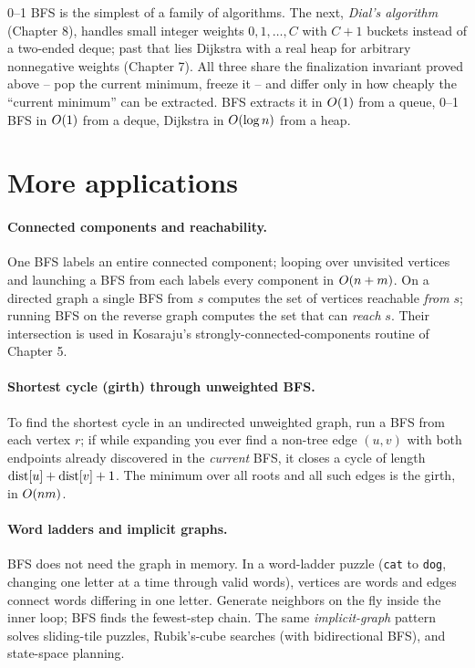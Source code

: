 \begin{connectionbox}
0--1 BFS is the simplest of a family of algorithms. The next, \emph{Dial's algorithm}
(Chapter 8), handles small integer weights $0,1,\dots,C$ with $C+1$ buckets
instead of a two-ended deque; past that lies Dijkstra with a real heap for
arbitrary nonnegative weights (Chapter 7). All three share the finalization
invariant proved above -- pop the current minimum, freeze it -- and differ only
in how cheaply the ``current minimum'' can be extracted. BFS extracts it in
$O(1)$ from a queue, 0--1 BFS in $O(1)$ from a deque, Dijkstra in
$O(\log n)$ from a heap.
\end{connectionbox}

\section{More applications}
\label{ch02:apps}

\paragraph{Connected components and reachability.}
One BFS labels an entire connected component; looping over unvisited vertices and
launching a BFS from each labels every component in $O(n+m)$. On a directed
graph a single BFS from $s$ computes the set of vertices reachable \emph{from}
$s$; running BFS on the reverse graph computes the set that can \emph{reach} $s$.
Their intersection is used in Kosaraju's strongly-connected-components routine of
Chapter 5.

\paragraph{Shortest cycle (girth) through unweighted BFS.}
To find the shortest cycle in an undirected unweighted graph, run a BFS from each
vertex $r$; if while expanding you ever find a non-tree edge $(u,v)$ with both
endpoints already discovered in the \emph{current} BFS, it closes a cycle of
length $\operatorname{dist}[u]+\operatorname{dist}[v]+1$. The minimum over all roots and all such edges is the
girth, in $O(nm)$.

\paragraph{Word ladders and implicit graphs.}
BFS does not need the graph in memory. In a word-ladder puzzle (\texttt{cat} to
\texttt{dog}, changing one letter at a time through valid words), vertices are
words and edges connect words differing in one letter. Generate neighbors on the
fly inside the inner loop; BFS finds the fewest-step chain. The same
\emph{implicit-graph} pattern solves sliding-tile puzzles, Rubik's-cube searches
(with bidirectional BFS), and state-space planning.

